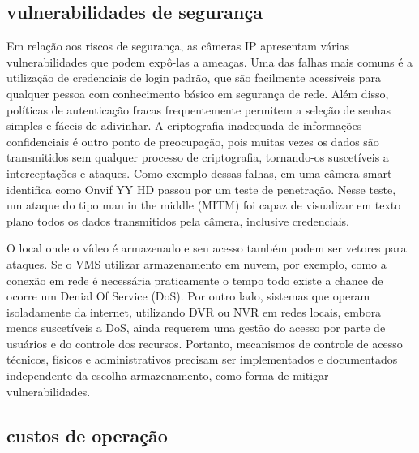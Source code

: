 \documentclass[12pt, %
openright, 
oneside, %
a4paper,    %
brazil]{facom-ufu-abntex2}
\begin{document}
\subsection{vulnerabilidades de segurança}

Em relação aos riscos de segurança, as câmeras IP apresentam várias
vulnerabilidades que podem expô-las a ameaças. Uma das falhas mais comuns é a
utilização de credenciais de login padrão, que são facilmente acessíveis para
qualquer pessoa com conhecimento básico em segurança de rede. Além disso,
políticas de autenticação fracas frequentemente permitem a seleção de senhas
simples e fáceis de adivinhar. A criptografia inadequada de informações
confidenciais é outro ponto de preocupação, pois muitas vezes os dados são
transmitidos sem qualquer processo de criptografia, tornando-os suscetíveis a
interceptações e ataques. Como exemplo dessas falhas, em 
uma câmera smart identifica como Onvif YY HD passou por um teste de penetração.
Nesse teste, um ataque do tipo man in the middle (MITM) foi capaz de visualizar
em texto plano todos os dados transmitidos pela câmera, inclusive credenciais.

O local onde o vídeo é armazenado e seu acesso também podem ser vetores para
ataques. Se o VMS utilizar armazenamento em nuvem, por exemplo, como a conexão
em rede é necessária praticamente o tempo todo existe a chance de ocorre um
Denial Of Service (DoS). Por outro lado, sistemas que operam isoladamente da
internet, utilizando DVR ou NVR em redes locais, embora menos suscetíveis a
DoS, ainda requerem uma gestão do acesso por parte de usuários e do controle
dos recursos. Portanto, mecanismos de controle de acesso técnicos, físicos e
administrativos precisam ser implementados e documentados independente da
escolha armazenamento, como forma de mitigar vulnerabilidades.

\subsection{custos de operação}



\end{document}
